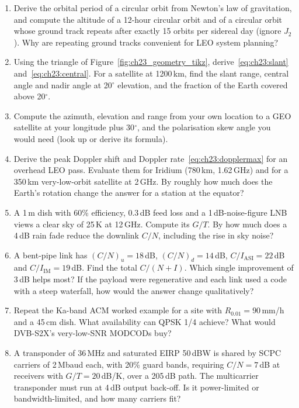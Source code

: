 \problems
{}
\begin{enumerate}[label=\thechapter.\arabic*]
\item Derive the orbital period of a circular orbit from Newton's law of gravitation, and compute
the altitude of a 12-hour circular orbit and of a circular orbit whose ground track repeats after
exactly 15 orbits per sidereal day (ignore $J_2$). Why are repeating ground tracks convenient for
LEO system planning?
\item Using the triangle of Figure~\ref{fig:ch23_geometry_tikz}, derive~\eqref{eq:ch23:slant}
and~\eqref{eq:ch23:central}. For a satellite at 1200\,km, find the slant range, central angle and
nadir angle at 20$^\circ$ elevation, and the fraction of the Earth covered above 20$^\circ$.
\item Compute the azimuth, elevation and range from your own location to a GEO satellite at your
longitude plus 30$^\circ$, and the polarisation skew angle you would need (look up or derive its
formula).
\item Derive the peak Doppler shift and Doppler rate~\eqref{eq:ch23:dopplermax} for an overhead
LEO pass. Evaluate them for Iridium (780\,km, 1.62\,GHz) and for a 350\,km very-low-orbit satellite at
2\,GHz. By roughly how much does the Earth's rotation change the answer for a station at the equator?
\item A 1\,m dish with 60\% efficiency, 0.3\,dB feed loss and a 1\,dB-noise-figure LNB views a clear
sky of 25\,K at 12\,GHz. Compute its $G/T$. By how much does a 4\,dB rain fade reduce the downlink
$C/N$, including the rise in sky noise?
\item A bent-pipe link has $(C/N)_u=18$\,dB, $(C/N)_d=14$\,dB, $C/I_{\text{ASI}}=22$\,dB and
$C/I_{\text{IM}}=19$\,dB. Find the total $C/(N+I)$. Which single improvement of 3\,dB helps most?
If the payload were regenerative and each link used a code with a steep waterfall, how would the
answer change qualitatively?
\item Repeat the Ka-band ACM worked example for a site with $R_{0.01}=90$\,mm/h and a 45\,cm dish.
What availability can QPSK 1/4 achieve? What would DVB-S2X's very-low-SNR MODCODs buy?
\item A transponder of 36\,MHz and saturated EIRP 50\,dBW is shared by SCPC carriers of
2\,Mbaud each, with 20\% guard bands, requiring $C/N=7$\,dB at receivers with $G/T=20$\,dB/K,
over a 205\,dB path. The multicarrier transponder must run at 4\,dB output back-off. Is it
power-limited or bandwidth-limited, and how many carriers fit?

\end{enumerate}
